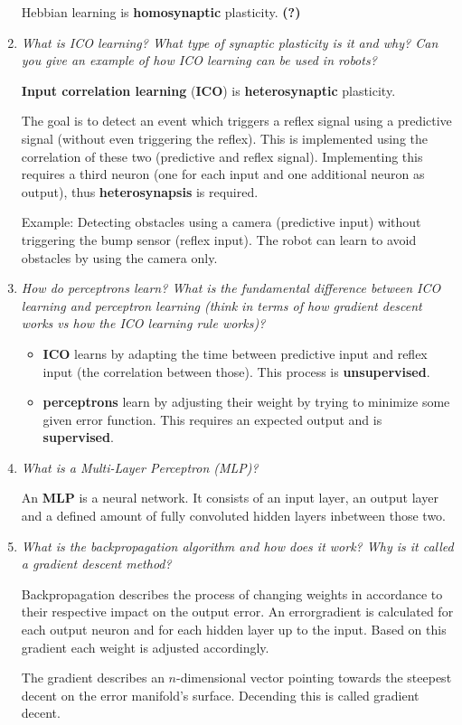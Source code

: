 \documentclass[
    fontsize      = 11pt,
    paper         = a4,
    twoside       = false,
    parskip       = half,
    pagesize      = false,
]{scrartcl}
\providecommand{\tightlist}{%
  \setlength{\itemsep}{0pt}\setlength{\parskip}{0pt}}
\begin{document}
\begin{enumerate}
  Hebbian learning is \textbf{homosynaptic} plasticity. \textbf{(?)}
\item
  \emph{What is ICO learning? What type of synaptic plasticity is it and
  why? Can you give an example of how ICO learning can be used in
  robots?}

  \textbf{Input correlation learning} (\textbf{ICO}) is
  \textbf{heterosynaptic} plasticity.

  The goal is to detect an event which triggers a reflex signal using a
  predictive signal (without even triggering the reflex). This is
  implemented using the correlation of these two (predictive and reflex
  signal). Implementing this requires a third neuron (one for each input
  and one additional neuron as output), thus \textbf{heterosynapsis} is
  required.

  Example: Detecting obstacles using a camera (predictive input) without
  triggering the bump sensor (reflex input). The robot can learn to
  avoid obstacles by using the camera only.
\item
  \emph{How do perceptrons learn? What is the fundamental difference
  between ICO learning and perceptron learning (think in terms of how
  gradient descent works vs how the ICO learning rule works)?}

  \begin{itemize}
  \tightlist
  \item
    \textbf{ICO} learns by adapting the time between predictive input
    and reflex input (the correlation between those). This process is
    \textbf{unsupervised}.
  \item
    \textbf{perceptrons} learn by adjusting their weight by trying to
    minimize some given error function. This requires an expected output
    and is \textbf{supervised}.
  \end{itemize}
\item
  \emph{What is a Multi-Layer Perceptron (MLP)?}

  An \textbf{MLP} is a neural network. It consists of an input layer, an
  output layer and a defined amount of fully convoluted hidden layers
  inbetween those two.
\item
  \emph{What is the backpropagation algorithm and how does it work? Why
  is it called a gradient descent method?}

  Backpropagation describes the process of changing weights in
  accordance to their respective impact on the output error. An
  errorgradient is calculated for each output neuron and for each hidden
  layer up to the input. Based on this gradient each weight is adjusted
  accordingly.

  The gradient describes an \(n\)-dimensional vector pointing towards
  the steepest decent on the error manifold's surface. Decending this is
  called gradient decent.
\end{enumerate}
\end{document}
